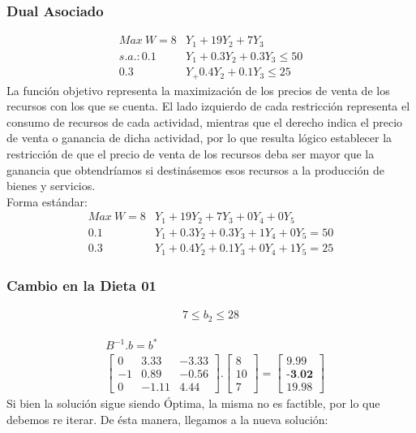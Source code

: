 \begin{homeworkProblem}
\subsubsection{Dual Asociado}
\begin{align*}
    Max\ W = 8&Y_1 + 19Y_2 + 7Y_3 \\
    s.a.: 0.1&Y_1 + 0.3Y_2 + 0.3Y_3 \le 50 \\
    0.3&Y_ + 0.4Y_2 + 0.1Y_3 \le 25
\end{align*}
La función objetivo representa la maximización de los precios de venta de los recursos con los que se cuenta. El lado izquierdo de cada restricción representa el consumo de recursos de cada actividad, mientras que el derecho indica el precio de venta o ganancia de dicha actividad, por lo que resulta lógico establecer la restricción de que el precio de venta de los recursos deba ser mayor que la ganancia que obtendríamos si destinásemos esos recursos a la producción de bienes y servicios. \\
Forma estándar:
\begin{align*}
    Max\ W = 8&Y_1 + 19Y_2 + 7Y_3 + 0Y_4 + 0Y_5 \\
     0.1&Y_1 + 0.3Y_2 + 0.3Y_3 + 1Y_4 + 0Y_5 = 50 \\
     0.3&Y_1 + 0.4Y_2 + 0.1Y_3 + 0Y_4 + 1Y_5 = 25
\end{align*}


\subsubsection{Cambio en la Dieta 01}
\begin{align*}
    7 \le b_2 \le 28
\end{align*}

\begin{align*}
  &B^{-1}.b = b^{*} \\
  &\begin{bmatrix}
   0 & 3.33 & -3.33 \\
   -1 & 0.89 & -0.56 \\
   0 & -1.11 & 4.44 
  \end{bmatrix}.
  \begin{bmatrix}
   8 \\
   10 \\
   7
  \end{bmatrix} =
  \begin{bmatrix}
   9.99 \\
   \textbf{-3.02} \\
   19.98
  \end{bmatrix}
\end{align*}
Si bien la solución sigue siendo Óptima, la misma no es factible, por lo que debemos re iterar. De ésta manera, llegamos a la nueva solución:


\end{homeworkProblem}
